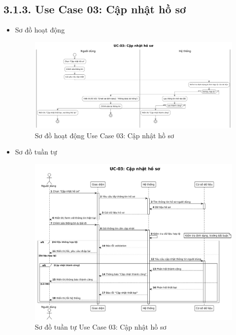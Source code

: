 \subsection*{3.1.3. Use Case 03: Cập nhật hồ sơ}
\begin{itemize}
    \item Sơ đồ hoạt động
    \begin{figure}[H]
    \centering
    \includegraphics[scale=0.32 ]{Picture/ACUC03.png}
    \caption{Sơ đồ hoạt động Use Case 03: Cập nhật hồ sơ}
    \end{figure}
    \item Sơ đồ tuần tự
    \begin{figure}[H]
    \centering
    \includegraphics[scale=0.35 ]{Picture/SEUC03.png}
    \caption{Sơ đồ tuần tự Use Case 03: Cập nhật hồ sơ}
    \end{figure}
\end{itemize}
